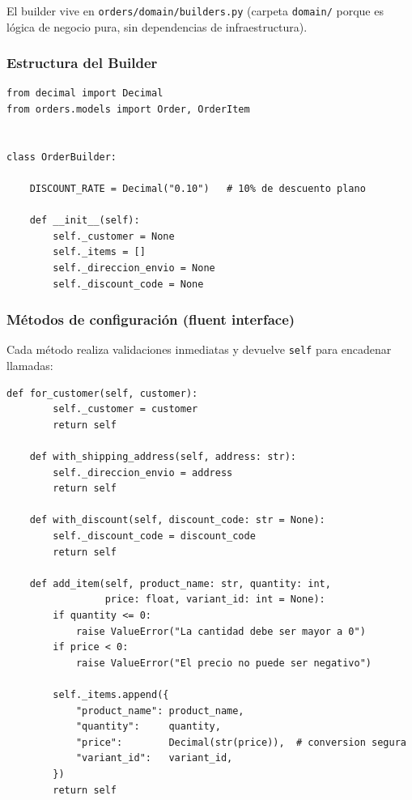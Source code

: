 \documentclass[12pt, a4paper]{article}
\begin{document}
El builder vive en \texttt{orders/domain/builders.py} (carpeta \texttt{domain/} porque es lógica de negocio pura, sin dependencias de infraestructura).

\subsubsection{Estructura del Builder}

\begin{lstlisting}[caption={orders/domain/builders.py — estructura base}]
from decimal import Decimal
from orders.models import Order, OrderItem


class OrderBuilder:

    DISCOUNT_RATE = Decimal("0.10")   # 10% de descuento plano

    def __init__(self):
        self._customer = None
        self._items = []
        self._direccion_envio = None
        self._discount_code = None
\end{lstlisting}

\subsubsection{Métodos de configuración (fluent interface)}

Cada método realiza validaciones inmediatas y devuelve \texttt{self} para encadenar llamadas:

\begin{lstlisting}[caption={orders/domain/builders.py — métodos fluent}]
    def for_customer(self, customer):
        self._customer = customer
        return self

    def with_shipping_address(self, address: str):
        self._direccion_envio = address
        return self

    def with_discount(self, discount_code: str = None):
        self._discount_code = discount_code
        return self

    def add_item(self, product_name: str, quantity: int,
                 price: float, variant_id: int = None):
        if quantity <= 0:
            raise ValueError("La cantidad debe ser mayor a 0")
        if price < 0:
            raise ValueError("El precio no puede ser negativo")

        self._items.append({
            "product_name": product_name,
            "quantity":     quantity,
            "price":        Decimal(str(price)),  # conversion segura
            "variant_id":   variant_id,
        })
        return self
\end{lstlisting}
\end{document}
